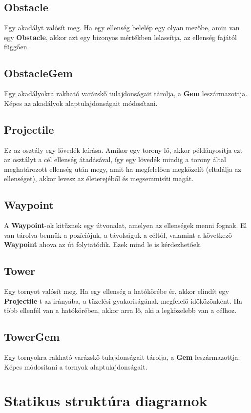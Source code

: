 \subsection{Obstacle}
Egy akadályt valósít meg. Ha egy ellenség belelép egy olyan mezőbe, amin van egy \textbf{Obstacle}, akkor azt egy bizonyos mértékben lelassítja, az ellenség fajától függően.

\subsection{ObstacleGem}
Egy akadályokra rakható varázskő tulajdonságait tárolja, a \textbf{Gem} leszármazottja. Képes az akadályok alaptulajdonságait módosítani.

\subsection{Projectile}
Ez az osztály egy lövedék leírása. Amikor egy torony lő, akkor példányosítja ezt az osztályt a cél ellenség átadásával, így egy lövedék mindig a torony által meghatározott ellenség után megy, amit ha megfelelően megközelít (eltalálja az ellenséget), akkor levesz az életerejéből és megsemmisíti magát.

\subsection{Waypoint}
A \textbf{Waypoint}-ok kitűznek egy útvonalat, amelyen az ellenségek menni fognak. El van tárolva bennük a pozíciójuk, a távolságuk a céltól, valamint a következő \textbf{Waypoint} ahova az út folytatódik. Ezek mind le is kérdezhetőek.

\subsection{Tower}
Egy tornyot valósít meg. Ha egy ellenség a hatókörébe ér, akkor elindít egy \textbf{Projectile}-t az irányába, a tüzelési gyakoriságának megfelelő időközönként. Ha több ellenfél van a hatókörében, akkor arra lő, aki a legközelebb van a célhoz.

\subsection{TowerGem}
Egy tornyokra rakható varázskő tulajdonságait tárolja, a \textbf{Gem} leszármazottja. Képes módosítani a tornyok alaptulajdonságait.

\section{Statikus struktúra diagramok}

